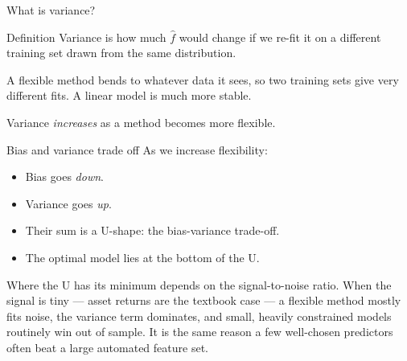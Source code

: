 \documentclass[aspectratio=169,11pt]{beamer}
\begin{document}
\begin{frame}{What is variance?}
  \begin{block}{Definition}
    Variance is how much $\hat f$ would change if we re-fit it on a
    different training set drawn from the same distribution.
  \end{block}
  \begin{numexample}
    A flexible method bends to whatever data it sees, so two training
    sets give very different fits. A linear model is much more
    stable.
  \end{numexample}
  \begin{takeaway}
    Variance \emph{increases} as a method becomes more flexible.
  \end{takeaway}
\end{frame}

\begin{frame}{Bias and variance trade off}
  As we increase flexibility:
  \begin{itemize}
    \item Bias goes \emph{down}.
    \item Variance goes \emph{up}.
    \item Their sum is a U-shape: the bias-variance trade-off.
    \item The optimal model lies at the bottom of the U.
  \end{itemize}
  Where the U has its minimum depends on the signal-to-noise ratio. When the signal is tiny
  --- asset returns are the textbook case --- a flexible method mostly fits noise, the
  variance term dominates, and small, heavily constrained models routinely win out of
  sample. It is the same reason a few well-chosen predictors often beat a large automated
  feature set.
\end{frame}
\end{document}

